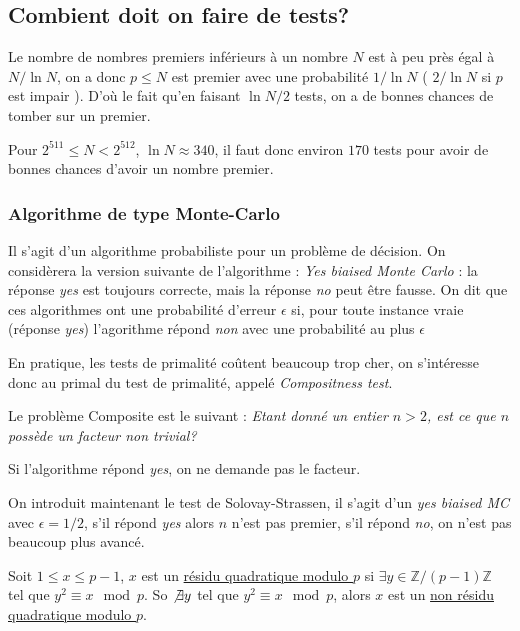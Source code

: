 \documentclass[a4paper, 10pt]{thesis}
\begin{document}
\subsection{Combient doit on faire de tests?}

Le nombre de nombres premiers inférieurs à un nombre $N$ est à peu près égal à $N / \ln N$, on a
donc $p \leq N$ est premier avec une probabilité $1 / \ln N$ ( $2 / \ln N$ si $p$ est impair ).
D'où le fait qu'en faisant $\ln N/2$ tests, on a de bonnes chances de tomber sur un premier.

\begin{ex}
    Pour $2^{511} \leq N < 2^{512}$, $\ln N \approx 340$, il faut donc environ $170$ tests pour
    avoir de bonnes chances d'avoir un nombre premier.
\end{ex}

\subsubsection{Algorithme de type Monte-Carlo}

Il s'agit d'un algorithme probabiliste pour un problème de décision. On considèrera la version
suivante de l'algorithme :
\emph{Yes biaised Monte Carlo} : la réponse \emph{yes} est toujours correcte, mais la
réponse \emph{no} peut être fausse. On dit que ces algorithmes ont une probabilité d'erreur
$\epsilon$ si, pour toute instance vraie (réponse \emph{yes}) l'agorithme répond \emph{non}
avec une probabilité au plus $\epsilon$

\begin{rq}
    En pratique, les tests de primalité coûtent beaucoup trop cher, on s'intéresse donc au primal du
    test de primalité, appelé \emph{Compositness test}.
\end{rq}

Le problème Composite est le suivant : \emph{Etant donné un entier $n > 2$, est ce que $n$ possède
un facteur non trivial?}

\begin{rq}
    Si l'algorithme répond \emph{yes}, on ne demande pas le facteur.
\end{rq}

On introduit maintenant le test de Solovay-Strassen, il s'agit d'un \emph{yes biaised MC} avec
$\epsilon = 1/2$, s'il répond \emph{yes} alors $n$ n'est pas premier, s'il répond \emph{no}, on
n'est pas beaucoup plus avancé.

\begin{df}
    Soit $1 \leq x \leq p -1$, $x$ est un \underline{résidu quadratique modulo $p$} si $\exists y \in
    \mathbb{Z}/(p-1)\mathbb{Z}$ tel que $y^2 \equiv x \mod p$. So $\not \exists y$ tel que $y^2
    \equiv x \mod p$, alors $x$ est un \underline{non résidu quadratique modulo $p$}.
\end{df}
\end{document}

